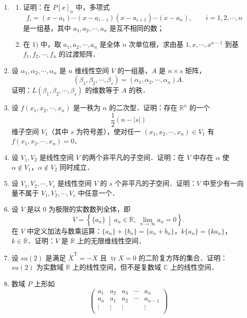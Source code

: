 \begin{enumerate}
  \item
  \begin{enumerate}
    \item 证明：在 $P[x]_n$ 中，多项式
    \[
      f_i=(x-a_1)\cdots(x-a_{i-1})(x-a_{i+1})\cdots(x-a_n),\qquad i=1,2,\cdots,n
    \]
    是一组基，其中 $a_1,a_2,\cdots,a_n$ 是互不相同的数；
  \anssub
    \item 在 1) 中，取 $a_1,a_2,\cdots,a_n$ 是全体 $n$ 次单位根，求由基 $1,x,\cdots,x^{n-1}$ 到基 $f_1,f_2,\cdots,f_n$ 的过渡矩阵．
  \anssub
  \end{enumerate}
  \item 设 $\alpha_1,\alpha_2,\cdots,\alpha_n$ 是 $n$ 维线性空间 $V$ 的一组基，$A$ 是 $n\times s$ 矩阵，
  \[
    (\beta_1,\beta_2,\cdots,\beta_s)=(\alpha_1,\alpha_2,\cdots,\alpha_n)A.
  \]
  证明：$L(\beta_1,\beta_2,\cdots,\beta_s)$ 的维数等于 $A$ 的秩．
  \ansproof
  \item 设 $f(x_1,x_2,\cdots,x_n)$ 是一秩为 $n$ 的二次型．证明：存在 $\mathbb{R}^n$ 的一个
  \[
    \frac{1}{2}\left(n-|s|\right)
  \]
  维子空间 $V_1$（其中 $s$ 为符号差），使对任一 $(x_1,\allowbreak x_2,\allowbreak \cdots,\allowbreak x_n)\in V_1$ 有 $f(x_1,\allowbreak x_2,\allowbreak \cdots,\allowbreak x_n)=0$．
  \ansproof
  \item 设 $V_1,V_2$ 是线性空间 $V$ 的两个非平凡的子空间．证明：在 $V$ 中存在 $\alpha$ 使 $\alpha\notin V_1$，$\alpha\notin V_2$ 同时成立．
  \ansproof
  \item 设 $V_1,V_2,\cdots,V_s$ 是线性空间 $V$ 的 $s$ 个非平凡的子空间．证明：$V$ 中至少有一向量不属于 $V_1,V_2,\cdots,V_s$ 中任意一个．
  \ansproof
  \item 设 $V$ 是以 0 为极限的实数数列全体，即
  \[
    V=\left\{\{a_n\}\ \middle|\ a_n\in\mathbb{R},\ \lim_{n\to\infty}a_n=0\right\}.
  \]
  在 $V$ 中定义加法与数乘运算：$\{a_n\}+\{b_n\}=\{a_n+b_n\}$，$k\{a_n\}=\{ka_n\}$，$k\in\mathbb{R}$．证明：$V$ 是 $\mathbb{R}$ 上的无限维线性空间．
  \ansproof
  \item 设 $su(2)$ 是满足 $\overline{X}^{\mathrm{T}}=-X$ 且 $\operatorname{tr}X=0$ 的二阶复方阵的集合．证明：$su(2)$ 为实数域 $\mathbb{R}$ 上的线性空间，但不是复数域 $\mathbb{C}$ 上的线性空间．
  \ansproof
  \item 数域 $P$ 上形如
  \[
    \begin{pmatrix}
      a_1&a_2&a_3&\cdots&a_n\\
      a_n&a_1&a_2&\cdots&a_{n-1}\\
      \vdots&\vdots&\vdots&&\vdots\\

\end{pmatrix}\]
\end{enumerate}
